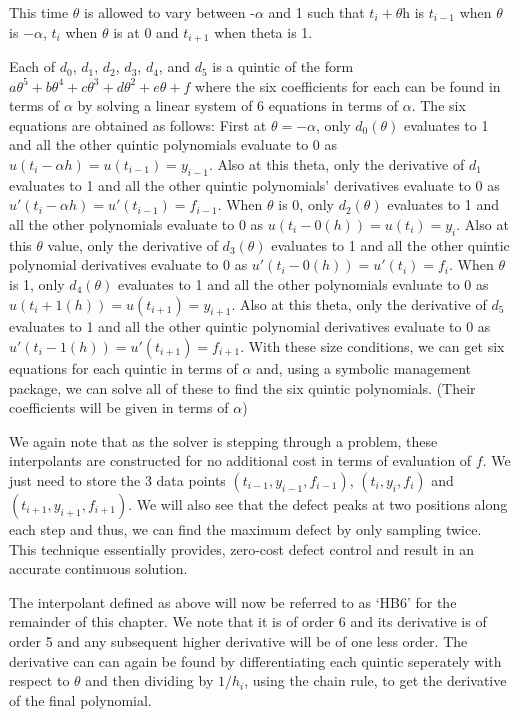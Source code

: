 \documentclass{article}
\begin{document}
This time $\theta$ is allowed to vary between -$\alpha$ and 1 such that $t_i + \theta$h is $t_{i - 1}$ when $\theta$ is $-\alpha$, $t_i$ when $\theta$ is at 0 and $t_{i + 1}$ when theta is 1.

Each of $d_0$, $d_1$, $d_2$, $d_3$, $d_4$, and $d_5$ is a quintic of the form $a\theta^5 + b\theta^4 + c\theta^3 + d\theta^2 + e\theta + f$ where the six coefficients for each can be found in terms of $\alpha$ by solving a linear system of 6 equations in terms of $\alpha$. The six equations are obtained as follows: First at $\theta = -\alpha$, only $d_0(\theta)$ evaluates to 1 and all the other quintic polynomials evaluate to 0 as $u(t_i - \alpha h) = u(t_{i - 1}) = y_{i - 1}$. Also at this theta, only the derivative of $d_1$ evaluates to 1 and all the other quintic polynomials' derivatives evaluate to 0 as $u'(t_i - \alpha h) = u'(t_{i - 1}) = f_{i - 1}$. When $\theta$ is 0, only $d_2(\theta)$ evaluates to 1 and all the other polynomials evaluate to 0 as $u(t_i - 0(h)) = u(t_i) = y_i$. Also at this $\theta$ value, only the derivative of $d_3(\theta)$ evaluates to 1 and all the other quintic polynomial derivatives evaluate to 0 as $u'(t_i - 0(h)) = u'(t_i) = f_i$. When $\theta$ is 1, only $d_4(\theta)$ evaluates to 1 and all the other polynomials evaluate to 0 as $u(t_i + 1(h)) = u(t_{i+1}) = y_{i+1}$. Also at this theta, only the derivative of $d_5$ evaluates to 1 and all the other quintic polynomial derivatives evaluate to 0 as $u'(t_i - 1(h)) = u'(t_{i+1}) = f_{i+1}$. With these size conditions, we can get six equations for each quintic in terms of $\alpha$ and, using a symbolic management package, we can solve all of these to find the six quintic polynomials. (Their coefficients will be given in terms of $\alpha$)

We again note that as the solver is stepping through a problem, these interpolants are constructed for no additional cost in terms of evaluation of $f$. We just need to store the 3 data points $(t_{i-1}, y_{i - 1}, f_{i - 1})$, $(t_i, y_i, f_i)$ and $(t_{i + 1}, y_{i + 1}, f_{i + 1})$. We will also see that the defect peaks at two positions along each step and thus, we can find the maximum defect by only sampling twice. This technique essentially provides, zero-cost defect control and result in an accurate continuous solution.

The interpolant defined as above will now be referred to as `HB6' for the remainder of this chapter. We note that it is of order 6 and its derivative is of order 5 and any subsequent higher derivative will be of one less order. The derivative can can again be found by differentiating each quintic seperately with respect to $\theta$ and then dividing by $1/h_i$, using the chain rule, to get the derivative of the final polynomial.
\end{document}
